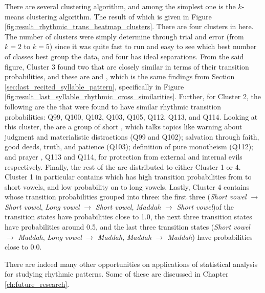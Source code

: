 There are several clustering algorithm, and among the simplest one is the $k$-means clustering algorithm. The result of which is given in Figure \ref{fig:result_rhythmic_trans_heatmap_clusters}. There are four clusters in here. The number of clusters were simply determine through trial and error (from $k=2$ to $k=5$) since it was quite fast to run and easy to see which best number of classes best group the data, and four has ideal separations. From the said figure, Cluster 3 found two   that are closely similar in terms of their transition probabilities, and these are  
and  , which is the same findings from Section \ref{sec:last_recited_syllable_pattern}, specifically in Figure \ref{fig:result_last_syllable_rhythmic_cross_similarities}. Further, for Cluster 2, the following are the   that were found to have similar rhythmic transition probabilities: Q99, Q100, Q102, Q103, Q105, Q112, Q113, and Q114. Looking at this cluster, the   are a group of short  , which talks topics like warning about judgment and materialistic distractions (Q99 and Q102); salvation through faith, good deeds, truth, and patience (Q103); definition of pure monotheism (Q112); and prayer  , Q113 and Q114, for protection from external and internal evils respectively. Finally, the rest of the   are distributed to either Cluster 1 or 4. Cluster 1 in particular contains   which has high transition probabilities from   to short vowels, and low probability on   to long vowels. Lastly, Cluster 4 contains   whose transition probabilities grouped into three: the first three (\textit{Short vowel} $\rightarrow$ \textit{Short vowel}, \textit{Long vowel} $\rightarrow$ \textit{Short vowel}, \textit{Maddah} $\rightarrow$ \textit{Short vowel})of the transition states have probabilities close to 1.0, the next three transition states have probabilities around 0.5, and the last three transition states (\textit{Short vowel} $\rightarrow$ \textit{Maddah}, \textit{Long vowel} $\rightarrow$ \textit{Maddah}, \textit{Maddah} $\rightarrow$ \textit{Maddah}) have probabilities close to 0.0.

There are indeed many other opportunities on applications of statistical analysis for studying rhythmic patterns. Some of these are discussed in Chapter \ref{ch:future_research}. 
